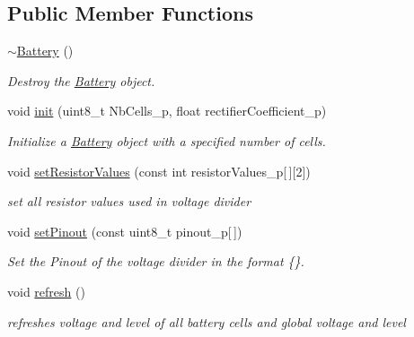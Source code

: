 \subsection*{Public Member Functions}
\begin{DoxyCompactItemize}
\item 
\mbox{\label{class_battery_a637d8766eb5cbdb33ab2a19a30622bc3}} 
\hyperlink{class_battery_a637d8766eb5cbdb33ab2a19a30622bc3}{$\sim$\+Battery} ()
\begin{DoxyCompactList}\small\item\em Destroy the \hyperlink{class_battery}{Battery} object. \end{DoxyCompactList}\item 
void \hyperlink{class_battery_aed541975df2c26475cbc0c37a9ddf659}{init} (uint8\+\_\+t Nb\+Cells\+\_\+p, float rectifier\+Coefficient\+\_\+p)
\begin{DoxyCompactList}\small\item\em Initialize a \hyperlink{class_battery}{Battery} object with a specified number of cells. \end{DoxyCompactList}\item 
void \hyperlink{class_battery_afb257ecd2eab7ed446d15ea9e78cc074}{set\+Resistor\+Values} (const int resistor\+Values\+\_\+p\mbox{[}$\,$\mbox{]}\mbox{[}2\mbox{]})
\begin{DoxyCompactList}\small\item\em set all resistor values used in voltage divider \end{DoxyCompactList}\item 
void \hyperlink{class_battery_a580d9582fbcf2c5f8185e3007852f73d}{set\+Pinout} (const uint8\+\_\+t pinout\+\_\+p\mbox{[}$\,$\mbox{]})
\begin{DoxyCompactList}\small\item\em Set the Pinout of the voltage divider in the format \{\}. \end{DoxyCompactList}\item 
\mbox{\label{class_battery_a7289442b8119494f06080d843c261c74}} 
void \hyperlink{class_battery_a7289442b8119494f06080d843c261c74}{refresh} ()
\begin{DoxyCompactList}\small\item\em refreshes voltage and level of all battery cells and global voltage and level \end{DoxyCompactList}\item 

\end{DoxyCompactItemize}
